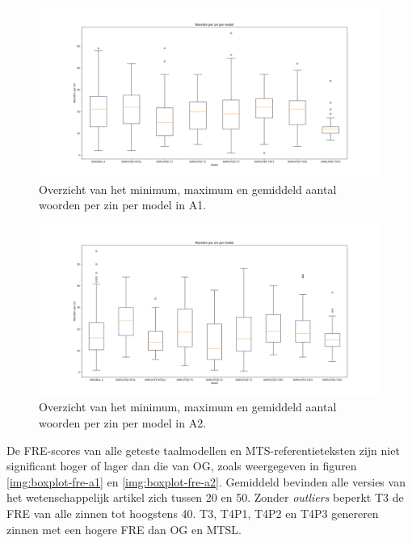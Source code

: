 \begin{figure}
	\includegraphics[width=\linewidth]{img/boxplot-avg-a1.png}
	\caption{Overzicht van het minimum, maximum en gemiddeld aantal woorden per zin per model in A1.}
	\label{img:boxplot-min-max-avg-words-a1}
\end{figure}

\begin{figure}
	\includegraphics[width=\linewidth]{img/boxplot-avg-a2.png}
	\caption{Overzicht van het minimum, maximum en gemiddeld aantal woorden per zin per model in A2.}
	\label{img:boxplot-min-max-avg-words-a2}
\end{figure}

De FRE-scores van alle geteste taalmodellen en MTS-referentieteksten zijn niet significant hoger of lager dan die van OG, zoals weergegeven in figuren \ref{img:boxplot-fre-a1} en \ref{img:boxplot-fre-a2}. Gemiddeld bevinden alle versies van het wetenschappelijk artikel zich tussen 20 en 50. Zonder \textit{outliers} beperkt T3 de FRE van alle zinnen tot hoogstens 40. T3, T4P1, T4P2 en T4P3 genereren zinnen met een hogere FRE dan OG en MTSL. 

